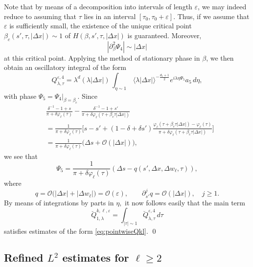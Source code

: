 \documentclass[leqno]{amsart}
\theoremstyle{definition}
\theoremstyle{remark}
\numberwithin{equation}{section}
\newcommand{\scriptO}{\mathcal{O}}
\newcommand\la{{\lambda}}
\newcommand\ve{{\varepsilon}}
\begin{document}
Note that by means of a decomposition into intervals of length $\ve$,
we may indeed reduce to assuming that $\tau$ lies in an interval
$[\tau_0,\tau_0+\ve]$. Thus, if we assume that $\ve$ is sufficiently
small, the existence of the unique critical point
$\beta_c(s',\tau,|\Delta x|)\sim 1$ of
$H(\beta,s',\tau,|\Delta x|)$ is guaranteed. Moreover,
\[
\left|\partial_\beta^2\Psi_4\right|\sim|\Delta x|
\]
at this critical point.
Applying the method of stationary phase in $\beta$, we then obtain an oscillatory integral of the form
 \begin{equation}
Q^{\varepsilon,4}_{\lambda,\tau}=
\lambda^{d} (\la|\Delta x|)\,   \int_{\eta\sim 1}\,
\langle \lambda|\Delta x|\rangle^{-\frac{d_1+1}{2}} e^{i\lambda\eta \Psi_5}  a_5 \, d\eta,   
\end{equation}
with phase $\Psi_5=\Psi_4|_{\beta=\beta_c}$. Since 
\begin{align*}
& \frac{\delta^{-1}-1 + s}{\pi + \delta \varphi_\ell(\tau)}
- \frac{ \delta^{-1}-1 + s'}{\pi + \delta \varphi_\ell(\tau + \beta_c \tau |\Delta x|)}\\
& = \frac{1}{\pi + \delta \varphi_\ell(\tau)} \bigg[ s-s'+ \left(1-\delta+\delta s'\right)
 \frac{\varphi_\ell(\tau + \beta_c \tau |\Delta x|)-\varphi_\ell(\tau) }{\pi+\delta\varphi_\ell(\tau + \beta_c\tau |\Delta x|)}\bigg]\\
& =  \frac{1}{\pi + \delta \varphi_\ell(\tau)} \Big(\Delta s+\scriptO(|\Delta x|)\Big),
\end{align*}
we see that 
\[
\Psi_5=\frac{1}{\pi + \delta \varphi_\ell(\tau)} \left(\Delta s - q(s',\Delta x,\Delta w_\ell,\tau)\right),
\]
where
\[
q=\scriptO\big(|\Delta x|+|\Delta w_\ell|\big)=\scriptO(\ve),
\qquad
\partial_{s'}^j q=\scriptO(|\Delta x|),\quad j\geq1.
\]
By means of integrations by parts in $\eta,$ it now follows easily that the main term 
\[
\breve Q^{k,\ell,\varepsilon}_{1,\lambda}=
  \int_{|\tau|\sim1}  \breve Q^{\ve,4}_{\lambda,\tau} \, d\tau 
\]
satisfies estimates of the form \eqref{eq:pointwiseQkl}.
\qed

\subsection{Refined $L^2$ estimates for  $\ell\ge 2$}\label{eq:inter-L2}
\end{document}
